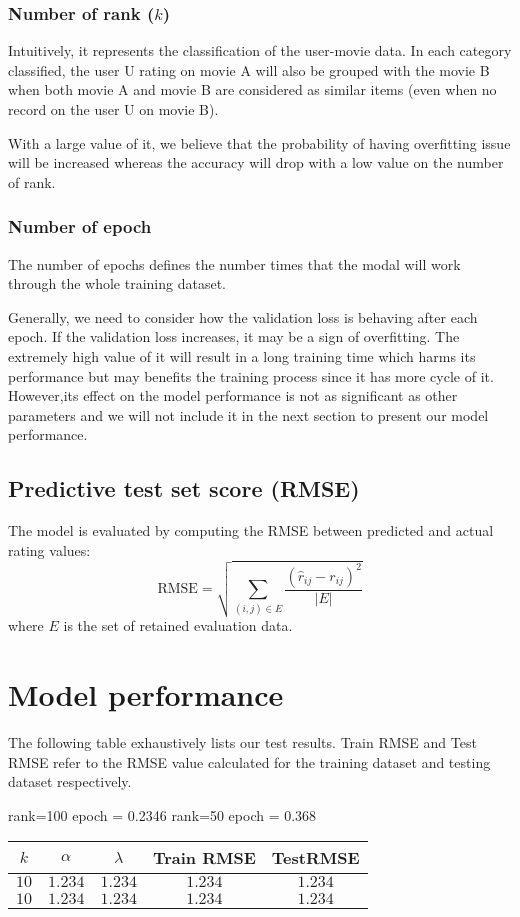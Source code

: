 \documentclass[final]{cvpr}
\begin{document}
\subsubsection{Number of rank  ($k$)}
Intuitively, it represents the classification of the user-movie data. In each category classified, the user U rating on movie A will also be grouped with the movie B when both movie A and movie B are considered as similar items (even when no record on the user U on movie B).

With a large value of it, we believe that the probability of having overfitting issue will be increased whereas the accuracy will drop with a low value on the number of rank.

\subsubsection{Number of epoch}
The number of epochs defines the number times that the modal will work through the whole training dataset. 

Generally, we need to consider how the validation loss is behaving after each epoch. If the validation loss increases, it may be a sign of overfitting.
The extremely high value of it will result in a long training time which harms its performance but may benefits the training process since it has more cycle of it. However,its effect on the model performance is not as significant as other parameters and we will not include it in the next section to present our model performance.

\subsection{Predictive test set score (RMSE)}
The model is evaluated by computing the RMSE between predicted and actual rating values:
$$ \text{RMSE} = \sqrt{\sum_{(i, j) \in E} \frac{{(\hat r_{ij} - r_{ij})}^2}{\left| E \right|}} $$
where $E$ is the set of retained evaluation data.

\section{Model performance}
The following table exhaustively lists our test results. Train RMSE and Test RMSE refer to the RMSE value calculated for the training dataset and testing dataset respectively.

rank=100
epoch = 0.2346
rank=50
epoch = 0.368

\begin{tabular}{| c | c | c | c | c |}

    \hline
    $k$ & $\alpha$ &  $\lambda$ & Train RMSE &  TestRMSE\\
    \hline
    $10$ & $1.234$ & $1.234$ & $1.234$ & $1.234$ \\
    \hline
    $10$ &  $1.234$& $1.234$ & $1.234$ & $1.234$\\
    \hline
\end{tabular}\\
\end{document}
